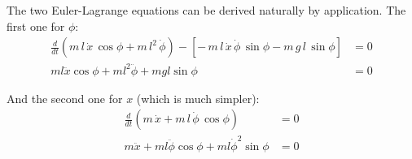 The two Euler-Lagrange equations can be derived naturally by application. The first one for $\phi$: 
\begin{align}
    \frac{d}{dt} \left( m\,l\,\dot{x}\,\cos\phi
     + m\,l^{2}\,\dot{\phi}\right) - \left[-\,m\,l\,\dot{x}\,\dot{\phi}\,\sin\phi
     - m\,g\,l\,\sin\phi\right] &= 0\\
    ml\ddot{x}\cos{\phi} + ml^{2}\ddot{\phi} + mgl\sin{\phi} & = 0 
\end{align}


And the second one for $x$ (which is much simpler): 
\begin{align}
    \frac{d}{dt} \left(m\,\dot{x} + m\,l\,\dot{\phi}\,\cos{\phi}\right)  & = 0 \\
    m\ddot{x} + ml\ddot{\phi}\cos{\phi} + ml\dot{\phi}^{2}\sin{\phi}  & = 0
\end{align}
